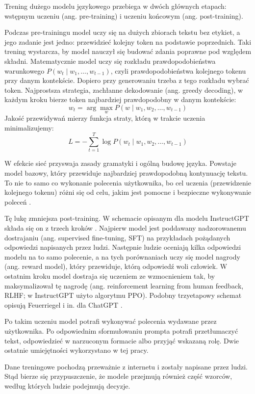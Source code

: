Trening dużego modelu językowego przebiega w dwóch głównych etapach: wstępnym uczeniu (ang. pre-training) i uczeniu końcowym (ang. post-training).

Podczas pre-trainingu model uczy się na dużych zbiorach tekstu bez etykiet, a jego zadanie jest jedno: przewidzieć kolejny token na podstawie poprzednich. Taki trening wystarcza, by model nauczył się budować zdania poprawne pod względem składni. Matematycznie model uczy się rozkładu prawdopodobieństwa warunkowego $P(w_t \mid w_1, \dots, w_{t-1})$, czyli prawdopodobieństwa kolejnego tokenu przy danym kontekście. Dopiero przy generowaniu trzeba z tego rozkładu wybrać token. Najprostsza strategia, zachłanne dekodowanie (ang. greedy decoding), w każdym kroku bierze token najbardziej prawdopodobny w danym kontekście:
\[
w_t = \arg\max_{w} P(w \mid w_1, w_2, \dots, w_{t-1})
\]
Jakość przewidywań mierzy funkcja straty, którą w trakcie uczenia minimalizujemy:
\[
L = -\sum_{t=1}^{T} \log P(w_t \mid w_1, w_2, \dots, w_{t-1})
\]

W efekcie sieć przyswaja zasady gramatyki i ogólną budowę języka. Powstaje model bazowy, który przewiduje najbardziej prawdopodobną kontynuację tekstu. To nie to samo co wykonanie polecenia użytkownika, bo cel uczenia (przewidzenie kolejnego tokenu) różni się od celu, jakim jest pomocne i bezpieczne wykonywanie poleceń \cite{training_language_models}.

Tę lukę zmniejsza post-training. W schemacie opisanym dla modelu InstructGPT składa się on z trzech kroków \cite{training_language_models}. Najpierw model jest poddawany nadzorowanemu dostrajaniu (ang. supervised fine-tuning, SFT) na przykładach pożądanych odpowiedzi napisanych przez ludzi. Następnie ludzie oceniają kilka odpowiedzi modelu na to samo polecenie, a na tych porównaniach uczy się model nagrody (ang. reward model), który przewiduje, którą odpowiedź woli człowiek. W ostatnim kroku model dostraja się uczeniem ze wzmocnieniem tak, by maksymalizował tę nagrodę (ang. reinforcement learning from human feedback, RLHF; w InstructGPT użyto algorytmu PPO). Podobny trzyetapowy schemat opisują Feuerriegel i in. dla ChatGPT \cite{feuerriegel_generative_ai}.

Po takim uczeniu model potrafi wykonywać polecenia wydawane przez użytkownika. Po odpowiednim sformułowaniu prompta potrafi przetłumaczyć tekst, odpowiedzieć w narzuconym formacie albo przyjąć wskazaną rolę. Dwie ostatnie umiejętności wykorzystano w tej pracy.

Dane treningowe pochodzą przeważnie z internetu i zostały napisane przez ludzi. Stąd bierze się przypuszczenie, że modele przejmują również część wzorców, według których ludzie podejmują decyzje.

